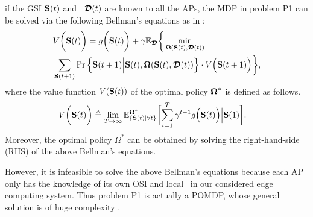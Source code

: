 if the GSI $\mathbf{S}(t)$ and \brlatency~$\boldsymbol{\mathcal{D}}(t)$ are known to all the APs,
the MDP in problem P1 can be solved via the following Bellman's equations as in \cite{sutton1998}:
{\small
\begin{align}
    &V\bigg(\mathbf{S}(t)\bigg) =g\bigg(\mathbf{S}(t)\bigg)
        + \gamma\mathbb{E}_{\boldsymbol{\mathcal{D}}}\bigg\{
            \min_{\boldsymbol{\Omega}(\mathbf{S}(t),\boldsymbol{\mathcal{D}}(t))}
            \nonumber\\
            &\sum_{\mathbf{S}(t+1)} \Pr \Big\{ 
                \mathbf{S}(t+1) \Big| \mathbf{S}(t), \boldsymbol{\Omega}(\mathbf{S}(t), \boldsymbol{\mathcal{D}}(t)) \Big\} \cdot V\Big(\mathbf{S}(t+1)\Big)
            \bigg\},
    \label{eqn:sp_0}
\end{align}
}%
where the value function $V(\mathbf{S}(t))$ of the optimal policy $\boldsymbol{\Omega}^{*}$ 
is defined as follows.
{\small
\begin{align}
    &V\Paren{\Stat(t)} \define
    \lim_{T\to\infty} 
    \mathbb{E}^{\Policy^*}_{\set{\Stat(t)|\forall t}} \Bracket{
        \sum_{t=1}^{T} \gamma^{t-1} g\Big( \Stat(t) \Big) \Big| \Stat(1)
    }.
    \label{eqn:val_f}
\end{align}
}%
Moreover, the optimal policy $\Omega^{*}$ can be obtained by solving the right-hand-side (RHS) of the above Bellman's equations.

However, it is infeasible to solve the above Bellman's equations because each AP only has the knowledge of its own OSI and local \brlatency~in our considered edge computing system.
Thus problem P1 is actually a POMDP, whose general solution is of huge complexity \cite{IJCAI03-NairR,IJCAI99-BoutilierC}.
